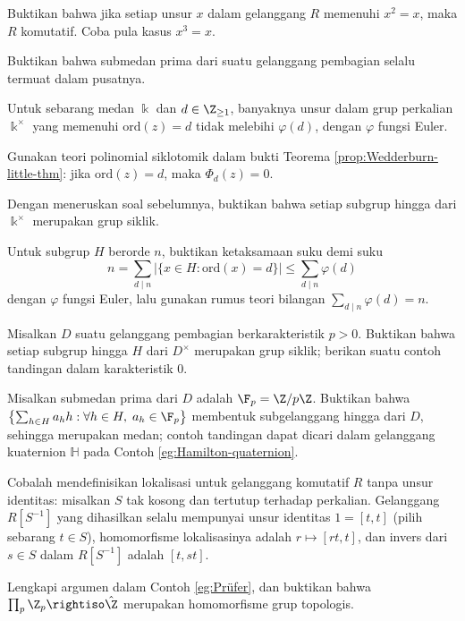 \begin{Exercises}
	\item Buktikan bahwa jika setiap unsur $x$ dalam gelanggang $R$ memenuhi $x^2=x$, maka $R$ komutatif. Coba pula kasus $x^3=x$.
	\item Buktikan bahwa submedan prima dari suatu gelanggang pembagian selalu termuat dalam pusatnya.
	\item Untuk sebarang medan $\Bbbk$ dan $d \in \Z_{\geq 1}$, banyaknya unsur dalam grup perkalian $\Bbbk^\times$ yang memenuhi $\text{ord}(z)=d$ tidak melebihi $\varphi(d)$, dengan $\varphi$ fungsi Euler.
	\begin{hint} Gunakan teori polinomial siklotomik dalam bukti Teorema \ref{prop:Wedderburn-little-thm}: jika $\text{ord}(z)=d$, maka $\Phi_d(z)=0$.\end{hint}
	\item Dengan meneruskan soal sebelumnya, buktikan bahwa setiap subgrup hingga dari $\Bbbk^\times$ merupakan grup siklik.
		\begin{hint}
		Untuk subgrup $H$ berorde $n$, buktikan ketaksamaan suku demi suku
			\[ n = \sum_{d \mid n} |\{ x \in H : \text{ord}(x)=d \}| \leq \sum_{d \mid n} \varphi(d) \]
		dengan $\varphi$ fungsi Euler, lalu gunakan rumus teori bilangan $\sum_{d \mid n} \varphi(d) = n$.
		\end{hint}
	\item Misalkan $D$ suatu gelanggang pembagian berkarakteristik $p>0$. Buktikan bahwa setiap subgrup hingga $H$ dari $D^\times$ merupakan grup siklik; berikan suatu contoh tandingan dalam karakteristik $0$.
	\begin{hint}
		Misalkan submedan prima dari $D$ adalah $\F_p = \Z/p\Z$. Buktikan bahwa $\left\{ \sum_{h \in H} a_h h : \forall h \in H, \; a_h \in \F_p \right\}$ membentuk subgelanggang hingga dari $D$, sehingga merupakan medan; contoh tandingan dapat dicari dalam gelanggang kuaternion $\mathbb{H}$ pada Contoh \ref{eg:Hamilton-quaternion}.
	\end{hint}
	\item Cobalah mendefinisikan lokalisasi untuk gelanggang komutatif $R$ tanpa unsur identitas: misalkan $S$ tak kosong dan tertutup terhadap perkalian. Gelanggang $R[S^{-1}]$ yang dihasilkan selalu mempunyai unsur identitas $1 = [t,t]$ (pilih sebarang $t \in S$), homomorfisme lokalisasinya adalah $r \mapsto [rt,t]$, dan invers dari $s \in S$ dalam $R[S^{-1}]$ adalah $[t,st]$.
	\item Lengkapi argumen dalam Contoh \ref{eg:Prüfer}, dan buktikan bahwa $\prod_p \Z_p \rightiso \hat{\Z}$ merupakan homomorfisme grup topologis.

\end{Exercises}
